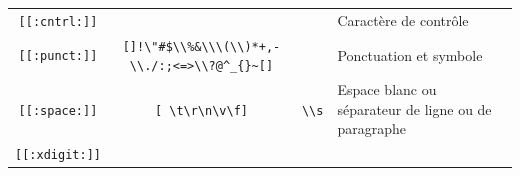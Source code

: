 \documentclass[
  11pt,
]{book}
\numberwithin{equation}{section}
\numberwithin{countremarque}{section}
\begin{document}
\begin{longtable}[]{@{}cccl@{}}
\begin{minipage}[t]{0.17\columnwidth}
\texttt{{[}{[}:cntrl:{]}{]}}\strut
\end{minipage} & \begin{minipage}[t]{0.21\columnwidth}\centering
\strut
\end{minipage} & \begin{minipage}[t]{0.21\columnwidth}\centering
\strut
\end{minipage} & \begin{minipage}[t]{0.29\columnwidth}\raggedright
Caractère de contrôle\strut
\end{minipage}\tabularnewline
\begin{minipage}[t]{0.17\columnwidth}\centering
\texttt{{[}{[}:punct:{]}{]}}\strut
\end{minipage} & \begin{minipage}[t]{0.21\columnwidth}\centering
\texttt{{[}{]}!\textbackslash{}"\#\$\textbackslash{}\textbackslash{}\%\&\textbackslash{}\textquotesingle{}\textbackslash{}\textbackslash{}(\textbackslash{}\textbackslash{})*+,-\textbackslash{}\textbackslash{}./:;\textless{}=\textgreater{}\textbackslash{}\textbackslash{}?@\^{}\_\textasciigrave{}\{\textbar{}\}\textasciitilde{}{[}{]}}\strut
\end{minipage} & \begin{minipage}[t]{0.21\columnwidth}\centering
\strut
\end{minipage} & \begin{minipage}[t]{0.29\columnwidth}\raggedright
Ponctuation et symbole\strut
\end{minipage}\tabularnewline
\begin{minipage}[t]{0.17\columnwidth}\centering
\texttt{{[}{[}:space:{]}{]}}\strut
\end{minipage} & \begin{minipage}[t]{0.21\columnwidth}\centering
\texttt{{[}\ \textbackslash{}t\textbackslash{}r\textbackslash{}n\textbackslash{}v\textbackslash{}f{]}}\strut
\end{minipage} & \begin{minipage}[t]{0.21\columnwidth}\centering
\texttt{\textbackslash{}\textbackslash{}s}\strut
\end{minipage} & \begin{minipage}[t]{0.29\columnwidth}\raggedright
Espace blanc ou séparateur de ligne ou de paragraphe\strut
\end{minipage}\tabularnewline
\begin{minipage}[t]{0.17\columnwidth}\centering
\texttt{{[}{[}:xdigit:{]}{]}}\strut
\end{minipage} & \begin{minipage}[t]{0.21\columnwidth}\centering

\end{minipage}
\end{longtable}
\end{document}
